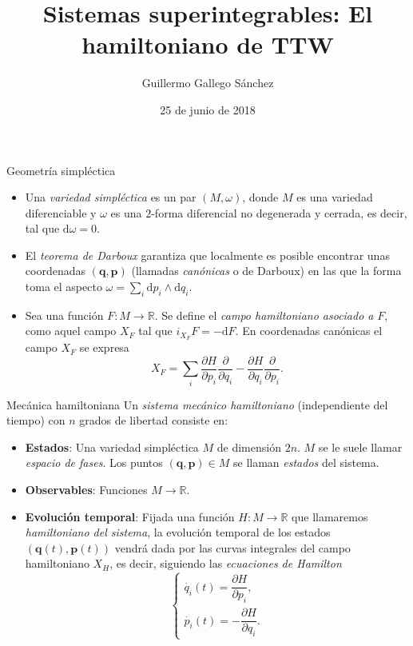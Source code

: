 \documentclass[aspectratio=169,mathserif]{beamer}
\title{Sistemas superintegrables: El hamiltoniano de TTW}
\author{Guillermo Gallego Sánchez}
\date{25 de junio de 2018}
\newcommand{\vect}[1]{\mathbf{#1}}
\begin{document}
\begin{frame}
  \maketitle
\end{frame}
\begin{frame}{Geometría simpléctica}
  \begin{itemize}
    \item  Una \emph{variedad simpléctica} es un par $(M,\omega)$, donde $M$ es una variedad diferenciable y $\omega$ es una $2$-forma diferencial no degenerada y cerrada, es decir, tal que $\mathrm{d}\omega=0$.

    \item  El \emph{teorema de Darboux} garantiza que localmente es posible encontrar unas coordenadas $(\vect{q},\vect{p})$ (llamadas \emph{canónicas} o de Darboux) en las que la forma toma el aspecto $\omega=\sum_i \mathrm{d}p_i \wedge \mathrm{d}q_i$.

 \item Sea una función $F:M\rightarrow \mathbb{R} $. Se define el \emph{campo hamiltoniano asociado a} $F$, como aquel campo $X_F$ tal que $i_{X_F}F=-\mathrm{d}F$. En coordenadas canónicas el campo $X_F$ se expresa
   \begin{equation*}
     X_F=\sum_i \frac{\partial H}{\partial p_i}\frac{\partial}{\partial q_i}-\frac{\partial H}{\partial q_i}\frac{\partial}{\partial p_i}.
   \end{equation*}
  \end{itemize}
\end{frame}

\begin{frame}{Mecánica hamiltoniana}
  Un \emph{sistema mecánico hamiltoniano} (independiente del tiempo) con $n$ grados de libertad consiste en:
  \begin{itemize}
    \item \textbf{Estados}: Una variedad simpléctica $M$ de dimensión $2n$. $M$ se le suele llamar \emph{espacio de fases}. Los puntos $(\vect{q},\vect{p})\in M$ se llaman \emph{estados} del sistema.
    \item \textbf{Observables}: Funciones $M\rightarrow \mathbb{R} $.
    \item \textbf{Evolución temporal}: Fijada una función $H:M\rightarrow \mathbb{R} $ que llamaremos \emph{hamiltoniano del sistema}, la evolución temporal de los estados $(\vect{q}(t),\vect{p}(t))$ vendrá dada por las curvas integrales del campo hamiltoniano $X_H$, es decir, siguiendo las \emph{ecuaciones de Hamilton}
      \begin{equation*}
	\begin{cases}
	  \dot{q_i}(t)=\dfrac{\partial H}{\partial p_i}, \\[8 pt]
	  \dot{p_i}(t)=-\dfrac{\partial H}{\partial q_i}.
	\end{cases}
      \end{equation*}
  \end{itemize}
\end{frame}
\end{document}
